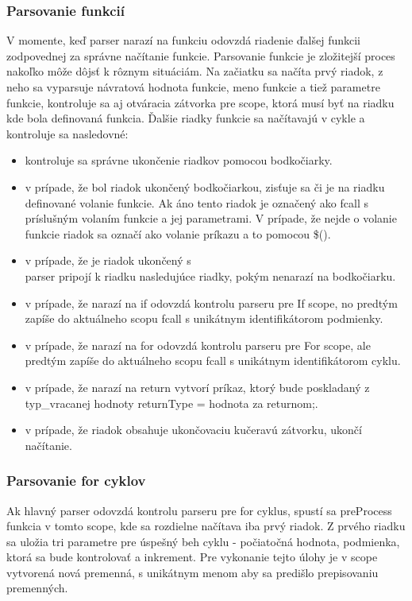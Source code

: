 {\subsubsection{Parsovanie funkcií}
\indent V momente, keď parser narazí na funkciu odovzdá riadenie ďalšej funkcii zodpovednej za správne načítanie funkcie. Parsovanie funkcie je zložitejší proces nakoľko môže dôjsť k rôznym situáciám. Na začiatku sa načíta prvý riadok, z neho sa vyparsuje návratová hodnota funkcie, meno funkcie a tiež parametre funkcie, kontroluje sa aj otváracia zátvorka pre scope, ktorá musí byť na riadku kde bola definovaná funkcia. Ďalšie riadky funkcie sa načítavajú v cykle a kontroluje sa nasledovné: 
\begin{itemize}	
	\item kontroluje sa správne ukončenie riadkov pomocou bodkočiarky.
	\item v prípade, že bol riadok ukončený bodkočiarkou, zisťuje sa či je na riadku definované volanie funkcie. Ak áno tento riadok je označený ako fcall s príslušným volaním funkcie a jej parametrami. V prípade, že nejde o volanie funkcie riadok sa označí ako volanie príkazu a to pomocou \$().
	\item v prípade, že je riadok ukončený s \\ parser pripojí k riadku nasledujúce riadky, pokým nenarazí na bodkočiarku.
	\item v prípade, že narazí na if odovzdá kontrolu parseru pre If scope, no predtým zapíše do aktuálneho scopu fcall s unikátnym identifikátorom podmienky.
	\item v prípade, že narazí na for odovzdá kontrolu parseru pre For scope, ale predtým zapíše do aktuálneho scopu fcall s unikátnym identifikátorom cyklu.
	\item v prípade, že narazí na return vytvorí príkaz, ktorý bude poskladaný z typ\_vracanej hodnoty returnType = hodnota za returnom;.
	\item  v prípade, že riadok obsahuje ukončovaciu kučeravú zátvorku, ukončí načítanie.
\end{itemize} 
\subsubsection{Parsovanie for cyklov}
\indent Ak hlavný parser odovzdá kontrolu parseru pre for cyklus, spustí sa preProcess funkcia v tomto scope, kde sa rozdielne načítava iba prvý riadok.
Z prvého riadku sa uložia tri parametre pre úspešný beh cyklu - počiatočná hodnota, podmienka, ktorá sa bude kontrolovať a inkrement. Pre vykonanie tejto úlohy je v scope vytvorená nová premenná, s unikátnym menom aby sa predišlo prepisovaniu premenných.
}

